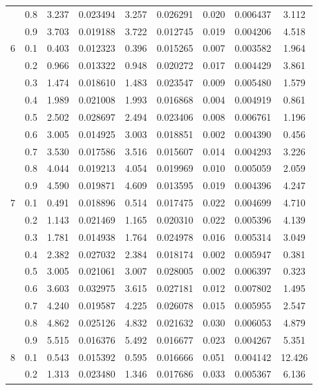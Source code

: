 \begin{longtable}{ | c | c || c | c | c | c | c | c | c | }
 & 0.8 & 3.237 & 0.023494 & 3.257 & 0.026291 & 0.020 & 0.006437 & 3.112 \\
 & 0.9 & 3.703 & 0.019188 & 3.722 & 0.012745 & 0.019 & 0.004206 & 4.518 \\
 \hline
\multirow{9}{*}{6} & 0.1 & 0.403 & 0.012323 & 0.396 & 0.015265 & 0.007 & 0.003582 & 1.964 \\
 & 0.2 & 0.966 & 0.013322 & 0.948 & 0.020272 & 0.017 & 0.004429 & 3.861 \\
 & 0.3 & 1.474 & 0.018610 & 1.483 & 0.023547 & 0.009 & 0.005480 & 1.579 \\
 & 0.4 & 1.989 & 0.021008 & 1.993 & 0.016868 & 0.004 & 0.004919 & 0.861 \\
 & 0.5 & 2.502 & 0.028697 & 2.494 & 0.023406 & 0.008 & 0.006761 & 1.196 \\
 & 0.6 & 3.005 & 0.014925 & 3.003 & 0.018851 & 0.002 & 0.004390 & 0.456 \\
 & 0.7 & 3.530 & 0.017586 & 3.516 & 0.015607 & 0.014 & 0.004293 & 3.226 \\
 & 0.8 & 4.044 & 0.019213 & 4.054 & 0.019969 & 0.010 & 0.005059 & 2.059 \\
 & 0.9 & 4.590 & 0.019871 & 4.609 & 0.013595 & 0.019 & 0.004396 & 4.247 \\
 \hline
\multirow{9}{*}{7} & 0.1 & 0.491 & 0.018896 & 0.514 & 0.017475 & 0.022 & 0.004699 & 4.710 \\
 & 0.2 & 1.143 & 0.021469 & 1.165 & 0.020310 & 0.022 & 0.005396 & 4.139 \\
 & 0.3 & 1.781 & 0.014938 & 1.764 & 0.024978 & 0.016 & 0.005314 & 3.049 \\
 & 0.4 & 2.382 & 0.027032 & 2.384 & 0.018174 & 0.002 & 0.005947 & 0.381 \\
 & 0.5 & 3.005 & 0.021061 & 3.007 & 0.028005 & 0.002 & 0.006397 & 0.323 \\
 & 0.6 & 3.603 & 0.032975 & 3.615 & 0.027181 & 0.012 & 0.007802 & 1.495 \\
 & 0.7 & 4.240 & 0.019587 & 4.225 & 0.026078 & 0.015 & 0.005955 & 2.547 \\
 & 0.8 & 4.862 & 0.025126 & 4.832 & 0.021632 & 0.030 & 0.006053 & 4.879 \\
 & 0.9 & 5.515 & 0.016376 & 5.492 & 0.016677 & 0.023 & 0.004267 & 5.351 \\
 \hline
\multirow{9}{*}{8} & 0.1 & 0.543 & 0.015392 & 0.595 & 0.016666 & 0.051 & 0.004142 & 12.426 \\
 & 0.2 & 1.313 & 0.023480 & 1.346 & 0.017686 & 0.033 & 0.005367 & 6.136 \\

\end{longtable}
